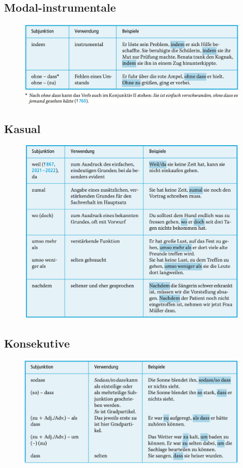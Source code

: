\documentclass[UTF8]{report}
\begin{document}
\subsection{Modal-instrumentale}
\begin{figure}[H]
    \centering
    \includegraphics[scale=0.5]{mi.png}
\end{figure}


\subsection{Kasual}
\begin{figure}[H]
    \centering
    \includegraphics[scale=0.55]{kas.png}
\end{figure}

\subsection{Konsekutive}
\begin{figure}[H]
    \centering
    \includegraphics[scale=0.55]{se.png}
\end{figure}
\end{document}
